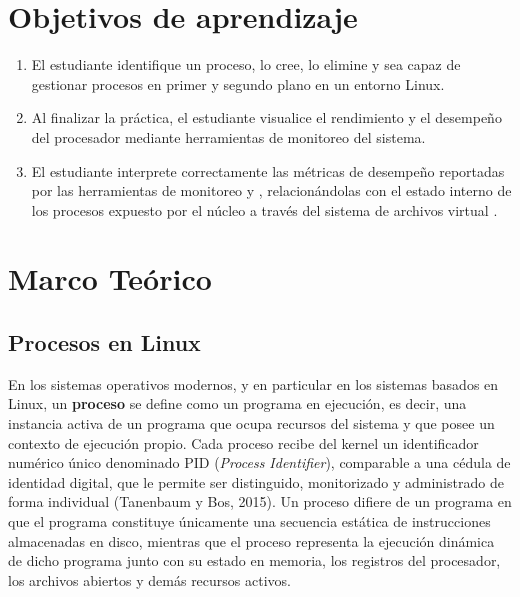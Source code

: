 \documentclass[12pt,a4paper]{article}
\DeclareRobustCommand\texttt[1]{{\ttfamily\seqsplit{#1}}}
\begin{document}
\thispagestyle{empty}
\null
\newpage

\tableofcontents
\newpage
\listoffigures
\listoftables
\newpage

\section{Objetivos de aprendizaje}

\begin{enumerate}[leftmargin=*]
    \item El estudiante identifique un proceso, lo cree, lo elimine y sea capaz de gestionar
    procesos en primer y segundo plano en un entorno Linux.
    \item Al finalizar la práctica, el estudiante visualice el rendimiento y el desempeño
    del procesador mediante herramientas de monitoreo del sistema.
    \item El estudiante interprete correctamente las métricas de desempeño reportadas por las
    herramientas de monitoreo \texttt{top} y \texttt{htop}, relacionándolas con el estado interno
    de los procesos expuesto por el núcleo a través del sistema de archivos virtual \texttt{/proc}.
\end{enumerate}

\section{Marco Teórico}

\subsection{Procesos en Linux}

En los sistemas operativos modernos, y en particular en los sistemas basados en Linux, un
\textbf{proceso} se define como un programa en ejecución, es decir, una instancia activa de un
programa que ocupa recursos del sistema y que posee un contexto de ejecución propio. Cada proceso
recibe del kernel un identificador numérico único denominado PID (\emph{Process Identifier}),
comparable a una cédula de identidad digital, que le permite ser distinguido, monitorizado y
administrado de forma individual (Tanenbaum y Bos, 2015). Un proceso difiere de un programa en
que el programa constituye únicamente una secuencia estática de instrucciones almacenadas en
disco, mientras que el proceso representa la ejecución dinámica de dicho programa junto con su
estado en memoria, los registros del procesador, los archivos abiertos y demás recursos activos.
\end{document}
